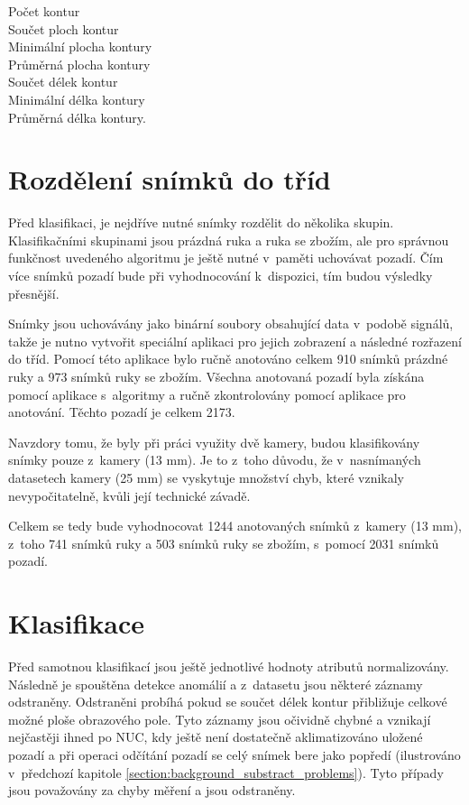 \begin{description}
\item [Počet kontur]
\item [Součet ploch kontur]
\item [Minimální plocha kontury]
\item [Průměrná plocha kontury]
\item [Součet délek kontur]
\item [Minimální délka kontury]
\item [Průměrná délka kontury.]
\end{description}


\section{Rozdělení snímků do tříd}
Před klasifikaci, je nejdříve nutné snímky rozdělit do několika skupin. Klasifikačními skupinami jsou prázdná ruka a ruka se zbožím, ale pro správnou funkčnost uvedeného algoritmu je ještě nutné v~paměti uchovávat pozadí. Čím více snímků pozadí bude při vyhodnocování k~dispozici, tím budou výsledky přesnější.

Snímky jsou uchovávány jako binární soubory obsahující data v~podobě signálů, takže je nutno vytvořit speciální aplikaci pro jejich zobrazení a následné rozřazení do tříd. Pomocí této aplikace bylo ručně anotováno celkem 910 snímků prázdné ruky a 973 snímků ruky se zbožím. Všechna anotovaná pozadí byla získána pomocí aplikace s~algoritmy a ručně zkontrolovány pomocí aplikace pro anotování. Těchto pozadí je celkem 2173.

Navzdory tomu, že byly při práci využity dvě kamery, budou klasifikovány snímky pouze z~kamery (13 mm). Je to z~toho důvodu, že v~nasnímaných datasetech kamery (25 mm) se vyskytuje množství chyb, které vznikaly nevypočitatelně, kvůli její technické závadě. 

Celkem se tedy bude vyhodnocovat 1244 anotovaných snímků z~kamery (13 mm), z~toho 741 snímků ruky a 503 snímků ruky se zbožím, s~pomocí 2031 snímků pozadí.


\section{Klasifikace}
Před samotnou klasifikací jsou ještě jednotlivé hodnoty atributů normalizovány. Následně je spouštěna detekce anomálií a z~datasetu jsou některé záznamy odstraněny. Odstraněni probíhá pokud se součet délek kontur přibližuje celkové možné ploše obrazového pole. Tyto záznamy jsou očividně chybné a vznikají nejčastěji ihned po NUC, kdy ještě není dostatečně aklimatizováno uložené pozadí a při operaci odčítání pozadí se celý snímek bere jako popředí (ilustrováno v~předchozí kapitole \ref{section:background_substract_problems}). Tyto případy jsou považovány za chyby měření a jsou odstraněny.

